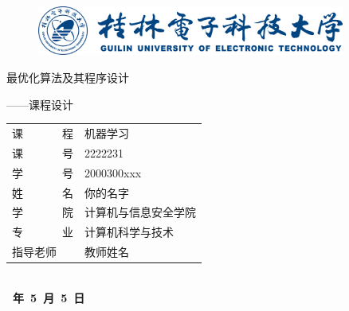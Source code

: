 
\begin{titlepage}
	\begin{center}
		\begin{figure}[!ht]\vspace{-1em}
			\centering
 			\includegraphics[width=0.90\textwidth]{figures/桂电标志.png}
			\vspace{3em}\\
          

		\end{figure}
		
		
		\vspace{5em}
		\begin{center} {\erhao\hei 最优化算法及其程序设计
				
				——课程设计}\end{center}
		
		\vspace{1em}
		{\sanhao
			\begin{center} \renewcommand{\arraystretch}{1.7}
				\begin{tabular}{l@{：}l}
					
					课~~~~~~~程 & 机器学习\\
					课~~~~~~~号 & 2222231\\
					学~~~~~~~号 & 2000300xxx \\
					姓~~~~~~~名 & 你的名字 \\
					学~~~~~~~院 & 计算机与信息安全学院\\
					专~~~~~~~业 & 计算机科学与技术\\
					指导老师    & 教师姓名 \\
					
				\end{tabular} \renewcommand{\arraystretch}{1}\\
				\vspace{8em}
				\textbf{~年~5~月~5~日} \\
			\end{center} 
		}
	\end{center}
	

\end{titlepage}
